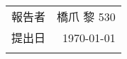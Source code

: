 \documentclass{jsarticle}
\title{}
\author{}
\date{}
\begin{document}
  \maketitle
  \begin{table}[b]
    \centering
    \begin{tabular}{:c:r:}
      \hdashline
      報告者 & 橋爪 黎  530 \\
      \hdashline
      提出日 & \today \\
      \hdashline
    \end{tabular}
  \end{table}

  \newpage

  \centerline{\Large }

  
\end{document}
